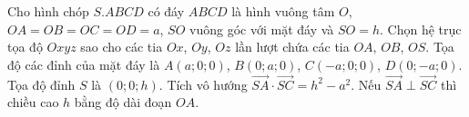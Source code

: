 \begin{ex}
Cho hình chóp $S.ABCD$ có đáy $ABCD$ là hình vuông tâm $O$, $OA=OB=OC=OD=a$, $SO$ vuông góc với mặt đáy và $SO=h$. Chọn hệ trục tọa độ $Oxyz$ sao cho các tia $Ox$, $Oy$, $Oz$ lần lượt chứa các tia $OA$, $OB$, $OS$.
\choiceTF
{\True Tọa độ các đỉnh của mặt đáy là $A(a;0;0)$, $B(0;a;0)$, $C(-a;0;0)$, $D(0;-a;0)$.}
{\True Tọa độ đỉnh $S$ là $(0;0;h)$.}
{\True Tích vô hướng $\overrightarrow{SA}\cdot\overrightarrow{SC}=h^2-a^2$.}
{\True Nếu $\overrightarrow{SA}\perp\overrightarrow{SC}$ thì chiều cao $h$ bằng độ dài đoạn $OA$.}
\end{ex}
